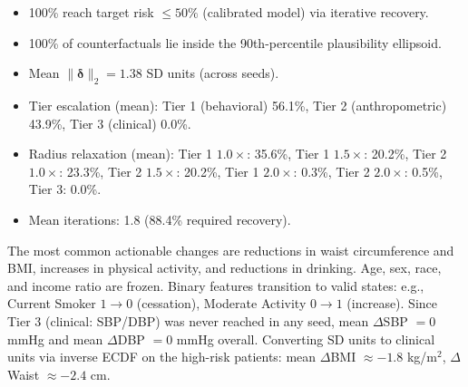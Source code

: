 \documentclass[11pt,a4paper]{article}
\theoremstyle{plain}
\begin{document}
\begin{itemize}
    \item 100\% reach target risk $\le 50\%$ (calibrated model) via iterative recovery.
    \item 100\% of counterfactuals lie inside the 90th-percentile plausibility ellipsoid.
    \item Mean $\|\boldsymbol{\delta}\|_2 = 1.38$ SD units (across seeds).
    \item Tier escalation (mean): Tier 1 (behavioral) 56.1\%, Tier 2 (anthropometric) 43.9\%, Tier 3 (clinical) 0.0\%.
    \item Radius relaxation (mean): Tier 1 $1.0\times$: 35.6\%, Tier 1 $1.5\times$: 20.2\%, Tier 2 $1.0\times$: 23.3\%, Tier 2 $1.5\times$: 20.2\%, Tier 1 $2.0\times$: 0.3\%, Tier 2 $2.0\times$: 0.5\%, Tier 3: 0.0\%.
    \item Mean iterations: 1.8 (88.4\% required recovery).
\end{itemize}

The most common actionable changes are reductions in waist circumference and BMI, increases in physical activity, and reductions in drinking. Age, sex, race, and income ratio are frozen. Binary features transition to valid states: e.g., Current Smoker $1 \to 0$ (cessation), Moderate Activity $0 \to 1$ (increase). Since Tier 3 (clinical: SBP/DBP) was never reached in any seed, mean $\Delta$SBP $= 0$ mmHg and mean $\Delta$DBP $= 0$ mmHg overall. Converting SD units to clinical units via inverse ECDF on the high-risk patients: mean $\Delta$BMI $\approx -1.8$ kg/m$^2$, $\Delta$Waist $\approx -2.4$ cm.

\begin{table}[htbp]
\centering
\caption{Counterfactual summary statistics (mean across 20 seeds, $n \approx 55$ high-risk patients per seed).}
\label{tab:counterfactual}
\end{table}
\end{document}
